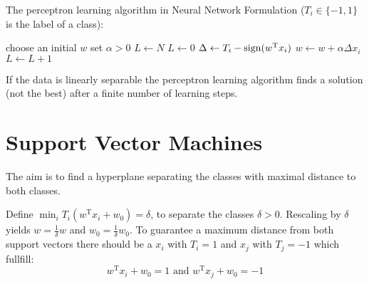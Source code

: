 The perceptron learning algorithm in Neural Network Formulation ($T_i \in \{-1, 1\}$ is the label of a class):
\begin{algorithmic}
    \State choose an initial $w$
    \State set $\alpha > 0$
    \State $L \gets N$
        $L \gets 0$
            \State $\Delta \gets T_i - \operatorname*{sign}(w^\text{T} x_i)$
                \State $w \gets w + \alpha \Delta x_i$
                \State $L \gets L + 1$
            \EndIf
        \EndFor
    \EndWhile
\end{algorithmic}

If the data is linearly separable the perceptron learning algorithm finds a solution (not the best) after a finite number of learning steps.


\section{Support Vector Machines}
The aim is to find a hyperplane separating the classes with maximal distance to both classes. 

Define $\min_i T_i (w^\text{T} x_i + w_0) = \delta$, to separate the classes $\delta > 0$. 
Rescaling by $\delta$ yields $w = \frac{1}{\delta} w$ and $w_0 = \frac{1}{\delta} w_0$.
To guarantee a maximum distance from both support vectors there should be a $x_i$ with $T_i = 1$ and $x_j$ with $T_j = -1$ which fullfill:
\begin{equation*}
    w^\text{T} x_i + w_0 = 1 \text{ and } w^\text{T} x_j + w_0 = -1
\end{equation*}
